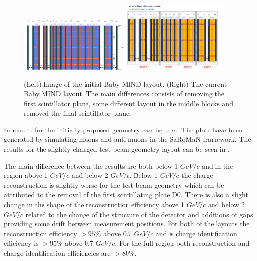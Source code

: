 \begin{figure}[h!]
\centering
\includegraphics[width=0.48\textwidth]{figures/oldStudies/oldMIND.png}
\includegraphics[width=0.46\textwidth]{figures/MIND.jpeg}
\caption{(Left) Image of the initial Baby MIND layout. (Right) The current Baby MIND layout. The main differences consists of removing the first scintillator plane, some different layout in the middle blocks and removed the final scintillator plane.}
\label{fig:oldMIND}
\end{figure}

In  results for the initially proposed geometry can be seen. The plots have been generated by simulating muons and anti-muons in the SaRoMaN framework. The results for the slightly changed test beam geometry layout can be seen in  . 

The main difference between the results are both below 1 $GeV/c$ and in the region above 1 $GeV/c$ and below 2 $GeV/c$. Below 1 $GeV/c$ the charge reconstruction is slightly worse for the test beam geometry which can be attributed to the removal of the first scintillating plate D0. There is also a slight change in the shape of the reconstruction efficiency above 1 $GeV/c$ and below 2 $GeV/c$ related to the change of the structure of the detector and additions of gaps providing some drift between measurement positions. For both of the layouts the reconstruction efficiency $> 95\%$ above 0.7 $GeV/c$ and  is charge identification efficiency is $> 95\%$ above 0.7 $GeV/c$. For the full region both reconstruction and charge identification efficiencies are $> 80\% $. 

